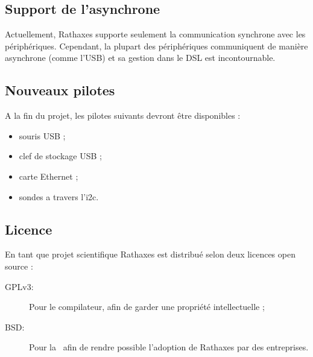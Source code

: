 \subsection{Support de l'asynchrone}

Actuellement, Rathaxes supporte seulement la communication synchrone avec les
périphériques. Cependant, la plupart des périphériques communiquent de manière
asynchrone (comme l'USB) et sa gestion dans le DSL est incontournable.

\subsection{Nouveaux pilotes}

A la fin du projet, les pilotes suivants devront être disponibles :
\begin{itemize}
\item souris USB ;
\item clef de stockage USB ;
\item carte Ethernet ;
\item sondes a travers l'i2c.
\end{itemize}

\subsection{Licence}

En tant que projet scientifique Rathaxes est distribué selon deux licences open
source :
\begin{description}
\item[GPLv3:] Pour le compilateur, afin de garder une propriété intellectuelle ;
\item[BSD:] Pour la \BL\ afin de rendre possible l'adoption de Rathaxes par des
entreprises.
\end{description}
